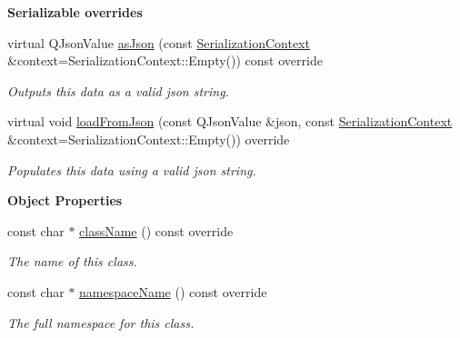 \begin{Indent}\textbf{ Serializable overrides}\par
\begin{DoxyCompactItemize}
\item 
\mbox{\label{classrev_1_1_event_listener_af51c55c5e1aab51630668caf7fc695dd}} 
virtual Q\+Json\+Value \mbox{\hyperlink{classrev_1_1_event_listener_af51c55c5e1aab51630668caf7fc695dd}{as\+Json}} (const \mbox{\hyperlink{structrev_1_1_serialization_context}{Serialization\+Context}} \&context=Serialization\+Context\+::\+Empty()) const override
\begin{DoxyCompactList}\small\item\em Outputs this data as a valid json string. \end{DoxyCompactList}\item 
\mbox{\label{classrev_1_1_event_listener_ac1ecf9e07cd797f9ec5b822b85ab2ae8}} 
virtual void \mbox{\hyperlink{classrev_1_1_event_listener_ac1ecf9e07cd797f9ec5b822b85ab2ae8}{load\+From\+Json}} (const Q\+Json\+Value \&json, const \mbox{\hyperlink{structrev_1_1_serialization_context}{Serialization\+Context}} \&context=Serialization\+Context\+::\+Empty()) override
\begin{DoxyCompactList}\small\item\em Populates this data using a valid json string. \end{DoxyCompactList}\end{DoxyCompactItemize}
\end{Indent}
\begin{Indent}\textbf{ Object Properties}\par
\begin{DoxyCompactItemize}
\item 
const char $\ast$ \mbox{\hyperlink{classrev_1_1_event_listener_a769859dbbf444d1a029ac563ce63806c}{class\+Name}} () const override
\begin{DoxyCompactList}\small\item\em The name of this class. \end{DoxyCompactList}\item 
const char $\ast$ \mbox{\hyperlink{classrev_1_1_event_listener_ada92683ca9340c93b2e6d84e9716fdcc}{namespace\+Name}} () const override
\begin{DoxyCompactList}\small\item\em The full namespace for this class. \end{DoxyCompactList}\end{DoxyCompactItemize}
\end{Indent}

